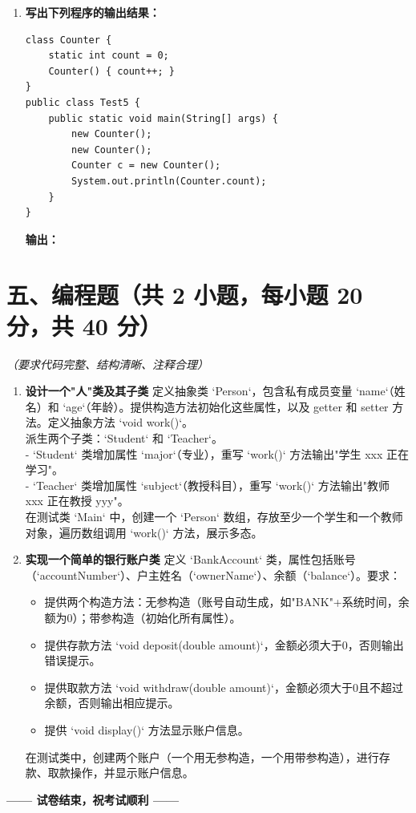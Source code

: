 \documentclass[a3paper, landscape, 11pt, twocolumn]{article}
\begin{document}
\begin{enumerate}[leftmargin=*, label=\arabic*., itemsep=1em]
	\item \textbf{写出下列程序的输出结果：}
	      \begin{lstlisting}[style=JavaExam]
class Counter {
    static int count = 0;
    Counter() { count++; }
}
public class Test5 {
    public static void main(String[] args) {
        new Counter();
        new Counter();
        Counter c = new Counter();
        System.out.println(Counter.count);
    }
}
\end{lstlisting}
	      \textbf{输出：}\underline{\hspace{6cm}}
\end{enumerate}

\newpage
\vspace{0.5cm}

\section*{五、编程题（共 2 小题，每小题 20 分，共 40 分）}
\textit{（要求代码完整、结构清晰、注释合理）}

\begin{enumerate}[leftmargin=*, label=\arabic*., itemsep=1em]
	\item \textbf{设计一个"人"类及其子类}
	      定义抽象类 `Person`，包含私有成员变量 `name`（姓名）和 `age`（年龄）。提供构造方法初始化这些属性，以及 getter 和 setter 方法。定义抽象方法 `void work()`。\\
	      派生两个子类：`Student` 和 `Teacher`。\\
	      - `Student` 类增加属性 `major`（专业），重写 `work()` 方法输出"学生 xxx 正在学习"。\\
	      - `Teacher` 类增加属性 `subject`（教授科目），重写 `work()` 方法输出"教师 xxx 正在教授 yyy"。\\
	      在测试类 `Main` 中，创建一个 `Person` 数组，存放至少一个学生和一个教师对象，遍历数组调用 `work()` 方法，展示多态。
	\item \textbf{实现一个简单的银行账户类}
	      定义 `BankAccount` 类，属性包括账号（`accountNumber`）、户主姓名（`ownerName`）、余额（`balance`）。要求：
	      \begin{itemize}
		      \item 提供两个构造方法：无参构造（账号自动生成，如"BANK"+系统时间，余额为0）；带参构造（初始化所有属性）。
		      \item 提供存款方法 `void deposit(double amount)`，金额必须大于0，否则输出错误提示。
		      \item 提供取款方法 `void withdraw(double amount)`，金额必须大于0且不超过余额，否则输出相应提示。
		      \item 提供 `void display()` 方法显示账户信息。
	      \end{itemize}
	      在测试类中，创建两个账户（一个用无参构造，一个用带参构造），进行存款、取款操作，并显示账户信息。
\end{enumerate}

\vfill

\begin{center}
	\bfseries —— 试卷结束，祝考试顺利 ——
\end{center}
\end{document}

